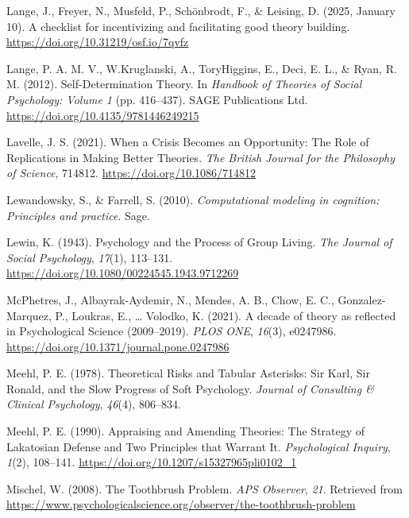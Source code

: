 \documentclass[
  man, noextraspace,floatsintext]{apa6}
\newlength{\cslhangindent}
\newenvironment{CSLReferences}[2] %
 {\begin{list}{}{%
  \setlength{\itemindent}{0pt}
  \setlength{\leftmargin}{0pt}
  \setlength{\parsep}{0pt}
  \ifodd #1
   \setlength{\leftmargin}{\cslhangindent}
   \setlength{\itemindent}{-1\cslhangindent}
  \fi
  \setlength{\itemsep}{#2\baselineskip}}}
 {\end{list}}
\begin{document}
\begin{CSLReferences}{1}{0}
Lange, J., Freyer, N., Musfeld, P., Schönbrodt, F., \& Leising, D. (2025, January 10). A checklist for incentivizing and facilitating good theory building. \url{https://doi.org/10.31219/osf.io/7qvfz}

Lange, P. A. M. V., W.Kruglanski, A., ToryHiggins, E., Deci, E. L., \& Ryan, R. M. (2012). Self-{Determination Theory}. In \emph{Handbook of {Theories} of {Social Psychology}: {Volume} 1} (pp. 416--437). SAGE Publications Ltd. \url{https://doi.org/10.4135/9781446249215}

Lavelle, J. S. (2021). When a {Crisis Becomes} an {Opportunity}: {The Role} of {Replications} in {Making Better Theories}. \emph{The British Journal for the Philosophy of Science}, 714812. \url{https://doi.org/10.1086/714812}

Lewandowsky, S., \& Farrell, S. (2010). \emph{Computational modeling in cognition: {Principles} and practice}. Sage.

Lewin, K. (1943). Psychology and the {Process} of {Group Living}. \emph{The Journal of Social Psychology}, \emph{17}(1), 113--131. \url{https://doi.org/10.1080/00224545.1943.9712269}

McPhetres, J., Albayrak-Aydemir, N., Mendes, A. B., Chow, E. C., Gonzalez-Marquez, P., Loukras, E., \ldots{} Volodko, K. (2021). A decade of theory as reflected in {Psychological Science} (2009--2019). \emph{PLOS ONE}, \emph{16}(3), e0247986. \url{https://doi.org/10.1371/journal.pone.0247986}

Meehl, P. E. (1978). Theoretical {Risks} and {Tabular Asterisks}: {Sir Karl}, {Sir Ronald}, and the {Slow Progress} of {Soft Psychology}. \emph{Journal of Consulting \& Clinical Psychology}, \emph{46}(4), 806--834.

Meehl, P. E. (1990). Appraising and {Amending Theories}: {The Strategy} of {Lakatosian Defense} and {Two Principles} that {Warrant It}. \emph{Psychological Inquiry}, \emph{1}(2), 108--141. \url{https://doi.org/10.1207/s15327965pli0102_1}

Mischel, W. (2008). The {Toothbrush Problem}. \emph{APS Observer}, \emph{21}. Retrieved from \url{https://www.psychologicalscience.org/observer/the-toothbrush-problem}


\end{CSLReferences}
\end{document}
